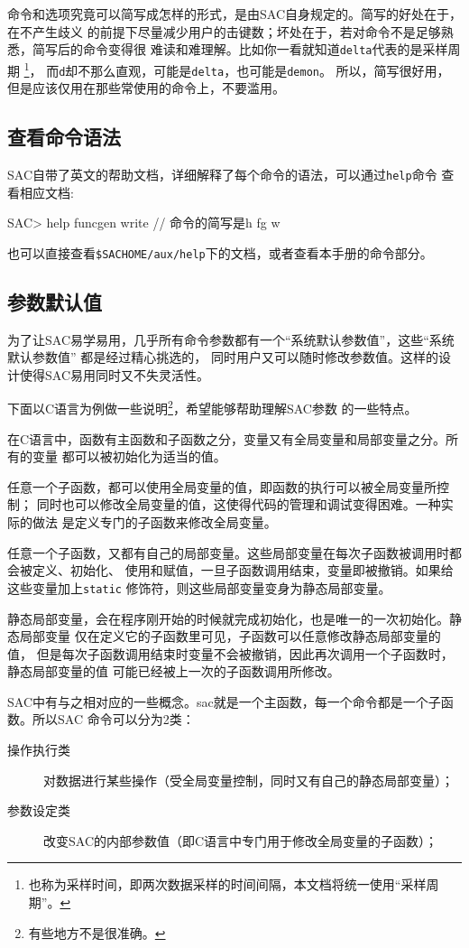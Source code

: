 命令和选项究竟可以简写成怎样的形式，是由SAC自身规定的。简写的好处在于，在不产生歧义
的前提下尽量减少用户的击键数；坏处在于，若对命令不是足够熟悉，简写后的命令变得很
难读和难理解。比如你一看就知道\lstinline{delta}代表的是采样周期
\footnote{也称为采样时间，即两次数据采样的时间间隔，本文档将统一使用``采样周期''。}，
而\lstinline{d}却不那么直观，可能是\lstinline{delta}，也可能是\lstinline{demon}。
所以，简写很好用，但是应该仅用在那些常使用的命令上，不要滥用。

\subsection{查看命令语法}
SAC自带了英文的帮助文档，详细解释了每个命令的语法，可以通过\lstinline{help}命令
查看相应文档:
\begin{SACCode}
SAC> help funcgen write   // 命令的简写是h fg w
\end{SACCode}
也可以直接查看\lstinline{$SACHOME/aux/help}下的文档，或者查看本手册的命令部分。

\subsection{参数默认值}
为了让SAC易学易用，几乎所有命令参数都有一个``系统默认参数值''，这些``系统默认参数值''
都是经过精心挑选的，
同时用户又可以随时修改参数值。这样的设计使得SAC易用同时又不失灵活性。

下面以C语言为例做一些说明\footnote{有些地方不是很准确。}，希望能够帮助理解SAC参数
的一些特点。

在C语言中，函数有主函数和子函数之分，变量又有全局变量和局部变量之分。所有的变量
都可以被初始化为适当的值。

任意一个子函数，都可以使用全局变量的值，即函数的执行可以被全局变量所控制；
同时也可以修改全局变量的值，这使得代码的管理和调试变得困难。一种实际的做法
是定义专门的子函数来修改全局变量。

任意一个子函数，又都有自己的局部变量。这些局部变量在每次子函数被调用时都会被定义、初始化、
使用和赋值，一旦子函数调用结束，变量即被撤销。如果给这些变量加上\lstinline{static}
修饰符，则这些局部变量变身为静态局部变量。

静态局部变量，会在程序刚开始的时候就完成初始化，也是唯一的一次初始化。静态局部变量
仅在定义它的子函数里可见，子函数可以任意修改静态局部变量的值，
但是每次子函数调用结束时变量不会被撤销，因此再次调用一个子函数时，静态局部变量的值
可能已经被上一次的子函数调用所修改。

SAC中有与之相对应的一些概念。sac就是一个主函数，每一个命令都是一个子函数。所以SAC
命令可以分为2类：
\begin{description}
\item[操作执行类] 对数据进行某些操作（受全局变量控制，同时又有自己的静态局部变量）；
\item[参数设定类] 改变SAC的内部参数值（即C语言中专门用于修改全局变量的子函数）； 
\end{description}

